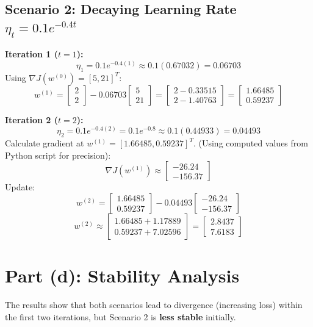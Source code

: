\documentclass{article}
\begin{document}
\subsection*{Scenario 2: Decaying Learning Rate $\eta_t = 0.1 e^{-0.4t}$}

\textbf{Iteration 1 ($t=1$):}
$$ \eta_1 = 0.1 e^{-0.4(1)} \approx 0.1(0.67032) = 0.06703 $$
Using $\nabla J(w^{(0)}) = [5, 21]^T$:
$$ w^{(1)} = \begin{bmatrix} 2 \\ 2 \end{bmatrix} - 0.06703 \begin{bmatrix} 5 \\ 21 \end{bmatrix} = \begin{bmatrix} 2 - 0.33515 \\ 2 - 1.40763 \end{bmatrix} = \begin{bmatrix} 1.66485 \\ 0.59237 \end{bmatrix} $$

\textbf{Iteration 2 ($t=2$):}
$$ \eta_2 = 0.1 e^{-0.4(2)} = 0.1 e^{-0.8} \approx 0.1(0.44933) = 0.04493 $$
Calculate gradient at $w^{(1)} = [1.66485, 0.59237]^T$.
(Using computed values from Python script for precision):
$$ \nabla J(w^{(1)}) \approx \begin{bmatrix} -26.24 \\ -156.37 \end{bmatrix} $$
Update:
$$ w^{(2)} = \begin{bmatrix} 1.66485 \\ 0.59237 \end{bmatrix} - 0.04493 \begin{bmatrix} -26.24 \\ -156.37 \end{bmatrix} $$
$$ w^{(2)} \approx \begin{bmatrix} 1.66485 + 1.17889 \\ 0.59237 + 7.02596 \end{bmatrix} = \begin{bmatrix} 2.8437 \\ 7.6183 \end{bmatrix} $$

\section*{Part (d): Stability Analysis}
The results show that both scenarios lead to divergence (increasing loss) within the first two iterations, but Scenario 2 is \textbf{less stable} initially.
\end{document}
